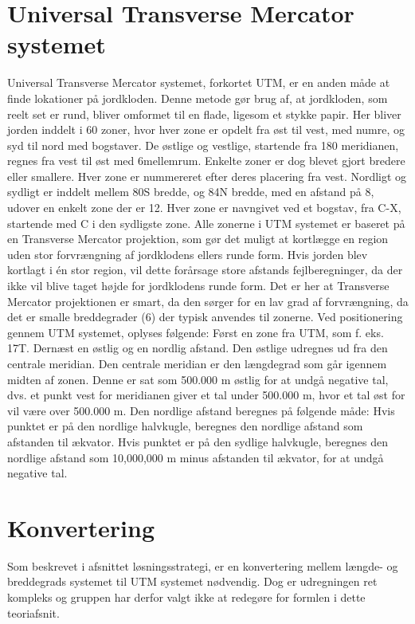 \section{Universal Transverse Mercator systemet}
Universal Transverse Mercator systemet, forkortet UTM, er en anden måde at finde lokationer på jordkloden. Denne metode gør brug af, at jordkloden, som reelt set er rund, bliver omformet til en flade, ligesom et stykke papir. Her bliver jorden inddelt i 60 zoner, hvor hver zone er opdelt fra øst til vest, med numre, og syd til nord med bogstaver. De østlige og vestlige, startende fra 180 meridianen, regnes fra vest til øst med 6\textdegree mellemrum. Enkelte zoner er dog blevet gjort bredere eller smallere. Hver zone er nummereret efter deres placering fra vest.\newline
Nordligt og sydligt er inddelt mellem 80\textdegree S bredde, og 84\textdegree N bredde, med en afstand på 8\textdegree, udover en enkelt zone der er 12\textdegree. Hver zone er  navngivet ved et bogstav, fra C-X, startende med C i den sydligste zone.
Alle zonerne i UTM systemet er baseret på en Transverse Mercator projektion, som gør det muligt at kortlægge en region uden stor forvrængning af jordklodens ellers runde form. Hvis jorden blev kortlagt i én stor region, vil dette forårsage store afstands fejlberegninger, da der ikke vil blive taget højde for jordklodens runde form. Det er her at Transverse Mercator projektionen er smart, da den sørger for en lav grad af forvrængning, da det er smalle breddegrader (6\textdegree) der typisk anvendes til zonerne. \newline
Ved positionering gennem UTM systemet, oplyses følgende: Først en zone fra UTM, som f. eks. 17T. Dernæst en østlig og en nordlig afstand. Den østlige udregnes ud fra den centrale meridian. Den centrale meridian er den længdegrad som går igennem midten af zonen. Denne er sat som 500.000 m østlig for at undgå negative tal, dvs. et punkt vest for meridianen giver et tal under 500.000 m, hvor et tal øst for vil være over 500.000 m.  Den nordlige afstand beregnes på følgende måde: Hvis punktet er på den nordlige halvkugle, beregnes den nordlige afstand som afstanden til ækvator. Hvis punktet er på den sydlige halvkugle, beregnes den nordlige afstand som 10,000,000 m minus afstanden til ækvator, for at undgå negative tal. \citep{UTMTeori}

\section{Konvertering}
Som beskrevet i afsnittet løsningsstrategi, er en konvertering mellem længde- og breddegrads systemet til UTM systemet nødvendig. Dog er udregningen ret kompleks og gruppen har derfor valgt ikke at redegøre for formlen i dette teoriafsnit.

